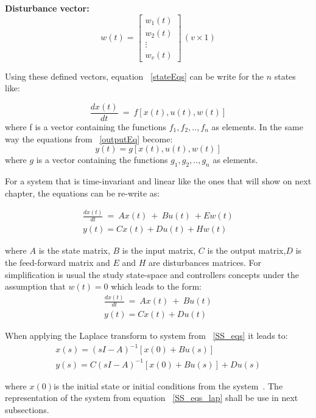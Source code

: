 \textbf{ Disturbance vector:}
    \begin{equation}
 w(t)=
 \left[
 \begin{matrix}
 w_1(t)\\
 w_2(t)\\
 \vdots\\
 w_v(t)
 \end{matrix}
 \right] \, (v\times 1)
 \end{equation}
 
 Using these defined vectors, equation ~\ref{stateEqs} can be write for the $n$ states like:\smallskip
 
 \begin{equation}
 	\frac{dx(t)}{dt}~=~ f[x(t),u(t),w(t)]
 \end{equation} 
 where f is a vector containing the functions $f_1,f_2,..,f_n$ as elements. In the same way the equations from ~\ref{outputEq} become:
 \begin{equation}
 	y(t)=g[x(t),u(t),w(t)]
 \end{equation}
 where $g$ is a vector containing the functions $g_1,g_2,..,g_n$ as elements.
 
 For a system that is time-invariant and linear like the ones that will show on next chapter, the equations can be re-write as:
 
 \begin{align}
	\frac{dx(t)}{dt}~=~ Ax(t)~+~Bu(t)~+Ew(t) \\
	y(t)=Cx(t)+Du(t)+Hw(t)
 \end{align}

  where $A$ is the state matrix, $B$ is the input matrix, $C$ is the output matrix,$D$ is the feed-forward matrix and  $E$ and $H$ are disturbances matrices. For simplification is usual the study state-space and controllers concepts under the assumption that $w(t) =0$ which leads to the form:
 \smallskip
 \begin{align}
 	 \frac{dx(t)}{dt}~=~ Ax(t)~+~Bu(t)\\
 	  y(t)=Cx(t)+Du(t)
 	  \label{SS_eqs}
 \end{align}

 When applying the Laplace transform to system from ~\ref{SS_eqs} it leads to:
 \begin{align}
 	x(s)=(sI-A)^{-1}[x(0)+Bu(s)]\\
 	y(s)=C(sI-A)^{-1}[x(0)+Bu(s)]+Du(s)
 	\label{SS_eqs_lap}
 \end{align}
 
 where $x(0) $is the initial state or initial conditions from the system~\cite[Chapter ~4]{Chen1999}. The representation of the system from equation ~\ref{SS_eqs_lap} shall be use in next subsections.\smallskip
 
